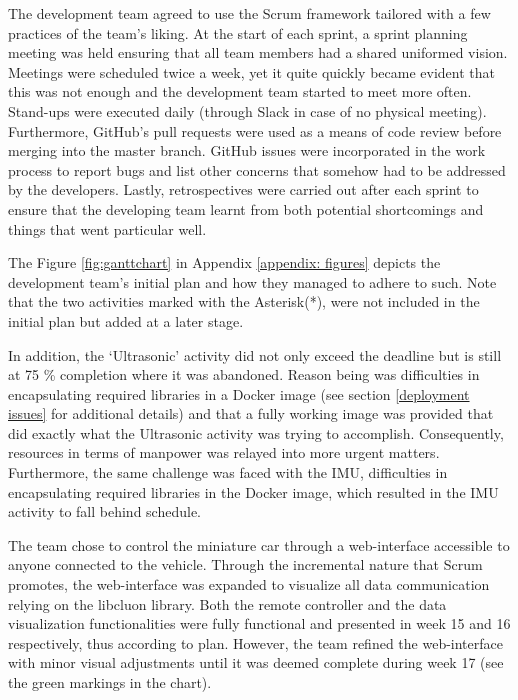 \documentclass[12pt]{article}
\begin{document}
The development team agreed to use the Scrum framework tailored with a few practices of the team's liking. At the start of each sprint, a sprint planning meeting was held ensuring that all team members had a shared uniformed vision. Meetings were scheduled twice a week, yet it quite quickly became evident that this was not enough and the development team started to meet more often. Stand-ups were executed daily (through Slack in case of no physical meeting). Furthermore, GitHub’s pull requests were used as a means of code review before merging into the master branch. GitHub issues were incorporated in the work process to report bugs and list other concerns that somehow had to be addressed by the developers. Lastly, retrospectives were carried out after each sprint to ensure that the developing team learnt from both potential shortcomings and things that went particular well.
 
The Figure \ref{fig:ganttchart} in Appendix \ref{appendix: figures} depicts the development team’s initial plan and how they managed to adhere to such. Note that the two activities marked with the Asterisk(*), were not included in the initial plan but added at a later stage. 

In addition, the ‘Ultrasonic’ activity did not only exceed the deadline but is still at 75 \% completion where it was abandoned. Reason being was difficulties in encapsulating required libraries in a Docker image (see section \ref{deployment issues} for additional details) and that a fully working image was provided that did exactly what the Ultrasonic activity was trying to accomplish. Consequently, resources in terms of manpower was relayed into more urgent matters. Furthermore, the same challenge was faced with the IMU, difficulties in encapsulating required libraries in the Docker image, which resulted in the IMU activity to fall behind schedule. 

The team chose to control the miniature car through a web-interface accessible to anyone connected to the vehicle. Through the incremental nature that Scrum promotes, the web-interface was expanded to visualize all data communication relying on the libcluon library\cite{libcluon}. Both the remote controller and the data visualization functionalities were fully functional and presented in week 15 and 16 respectively, thus according to plan. However, the team refined the web-interface with minor visual adjustments until it was deemed complete during week 17 (see the green markings in the chart).
\pagebreak
\end{document}
